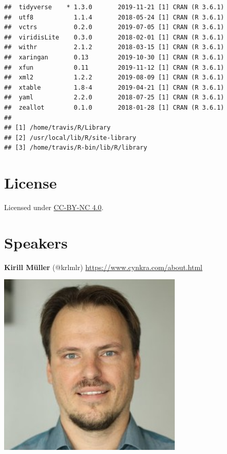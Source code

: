 \documentclass[]{book}
\begin{document}
\begin{verbatim}
##  tidyverse    * 1.3.0       2019-11-21 [1] CRAN (R 3.6.1)                   
##  utf8           1.1.4       2018-05-24 [1] CRAN (R 3.6.1)                   
##  vctrs          0.2.0       2019-07-05 [1] CRAN (R 3.6.1)                   
##  viridisLite    0.3.0       2018-02-01 [1] CRAN (R 3.6.1)                   
##  withr          2.1.2       2018-03-15 [1] CRAN (R 3.6.1)                   
##  xaringan       0.13        2019-10-30 [1] CRAN (R 3.6.1)                   
##  xfun           0.11        2019-11-12 [1] CRAN (R 3.6.1)                   
##  xml2           1.2.2       2019-08-09 [1] CRAN (R 3.6.1)                   
##  xtable         1.8-4       2019-04-21 [1] CRAN (R 3.6.1)                   
##  yaml           2.2.0       2018-07-25 [1] CRAN (R 3.6.1)                   
##  zeallot        0.1.0       2018-01-28 [1] CRAN (R 3.6.1)                   
## 
## [1] /home/travis/R/Library
## [2] /usr/local/lib/R/site-library
## [3] /home/travis/R-bin/lib/R/library
\end{verbatim}

\hypertarget{license}{%
\section*{License}\label{license}}

Licensed under \href{https://creativecommons.org/licenses/by-nc/4.0/}{CC-BY-NC 4.0}.

\hypertarget{speakers}{%
\section*{Speakers}\label{speakers}}

\textbf{Kirill Müller} (@krlmlr) \url{https://www.cynkra.com/about.html}

\begin{flushright}\includegraphics[width=3.47in]{img/kirill} \end{flushright}
\end{document}

